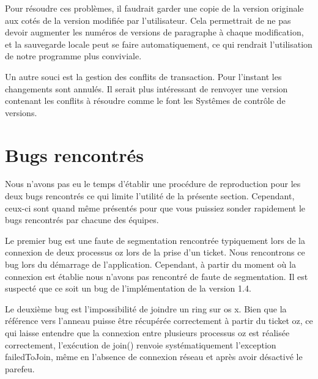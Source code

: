 \documentclass{article}
\begin{document}
	 	Pour résoudre ces problèmes, il faudrait garder une copie de
	 	la version originale aux cotés de la version modifiée par l'utilisateur.
	 	Cela permettrait de ne pas devoir augmenter les numéros de versions
	 	de paragraphe à chaque modification, et la sauvegarde locale peut
	 	se faire automatiquement, ce qui rendrait l'utilisation de notre
	 	programme plus conviviale. 
	 	
	 	Un autre souci est la gestion des conflits de transaction.
	 	Pour l'instant les changements sont annulés. Il serait plus
	 	intéressant de renvoyer une version contenant les conflits à résoudre
	 	comme le font les Systêmes de contrôle de versions.
		
	\section{Bugs rencontrés}
	Nous n'avons pas eu le temps d'établir une procédure de reproduction pour les deux bugs
	rencontrés ce qui limite l'utilité de la présente section.  Cependant, ceux-ci sont quand même 
	présentés pour que vous puissiez sonder rapidement le bugs rencontrés par chacune des équipes.
	
	Le premier bug est une faute de segmentation rencontrée typiquement lors de la connexion de 
	deux processus oz lors de la prise d'un ticket.  Nous rencontrons ce bug lors du démarrage
	de l'application.  Cependant, à partir du moment où la connexion est établie nous n'avons pas 
	rencontré de faute de segmentation.  Il est suspecté que ce soit un bug de l'implémentation de la version 1.4.
	
	Le deuxième bug est l'impossibilité de joindre un ring sur os x.  Bien que la référence vers l'anneau
	puisse être récupérée correctement à partir du ticket oz, ce qui laisse entendre que la connexion entre 
	plusieurs processus oz est réalisée correctement, l'exécution de join() renvoie systématiquement
	l'exception failedToJoin, même en l'absence de connexion réseau et après avoir désactivé le parefeu.
\end{document}
